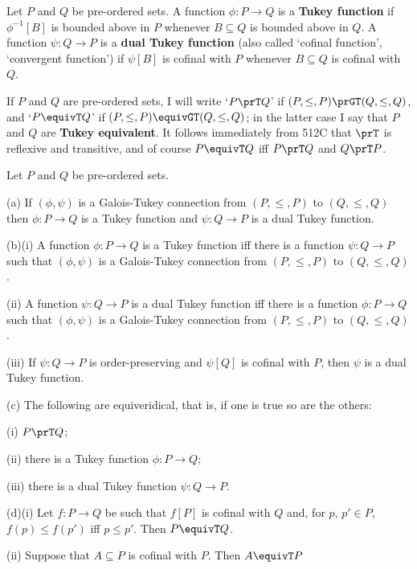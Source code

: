  Let $P$ and $Q$ be pre-ordered sets.
A function $\phi:P\to Q$ is a {\bf Tukey function} if $\phi^{-1}[B]$ is
bounded above in $P$ whenever $B\subseteq Q$ is bounded above in $Q$.
A function $\psi:Q\to P$ is a {\bf dual Tukey function} (also called
`cofinal function', `convergent function') if $\psi[B]$ is
cofinal with $P$ whenever $B\subseteq Q$ is cofinal with $Q$.

If $P$ and $Q$ are pre-ordered sets, I
will write `$P\prT Q$' if $(P,\le,P)\prGT(Q,\le,Q)$, and `$P\equivT Q$'
if $(P,\le,P)\equivGT(Q,\le,Q)$;  in the latter case I say that $P$ and
$Q$ are {\bf Tukey equivalent}.   It follows immediately from 512C that
$\prT$ is reflexive and transitive, and of course $P\equivT Q$ iff
$P\prT Q$ and $Q\prT P$.

 Let $P$ and $Q$ be pre-ordered sets.

(a) If $(\phi,\psi)$ is a Galois-Tukey connection from $(P,\le,P)$ to
$(Q,\le,Q)$ then $\phi:P\to Q$ is a Tukey function and $\psi:Q\to P$ is
a dual Tukey function.

(b)(i) A function $\phi:P\to Q$ is a Tukey function iff there is a
function $\psi:Q\to P$ such that $(\phi,\psi)$ is a Galois-Tukey
connection from $(P,\le,P)$ to $(Q,\le,Q)$.

\quad(ii) A function $\psi:Q\to P$ is a dual Tukey function iff there is
a function $\phi:P\to Q$ such that $(\phi,\psi)$ is a Galois-Tukey
connection from $(P,\le,P)$ to $(Q,\le,Q)$.

\quad(iii) If $\psi:Q\to P$ is order-preserving and $\psi[Q]$ is cofinal
with $P$, then $\psi$ is a dual Tukey function.

(c) The following are equiveridical, that is, if one is true so are the
others:

\quad(i) $P\prT Q$;

\quad(ii) there is a Tukey function $\phi:P\to Q$;

\quad(iii) there is a dual Tukey function $\psi:Q\to P$.

(d)(i) Let $f:P\to Q$ be such that $f[P]$ is cofinal with $Q$ and, for $p$,
$p'\in P$, $f(p)\le f(p')$ iff $p\le p'$.   Then $P\equivT Q$.

\quad(ii) Suppose that $A\subseteq P$ is cofinal with $P$.   Then
$A\equivT P$

